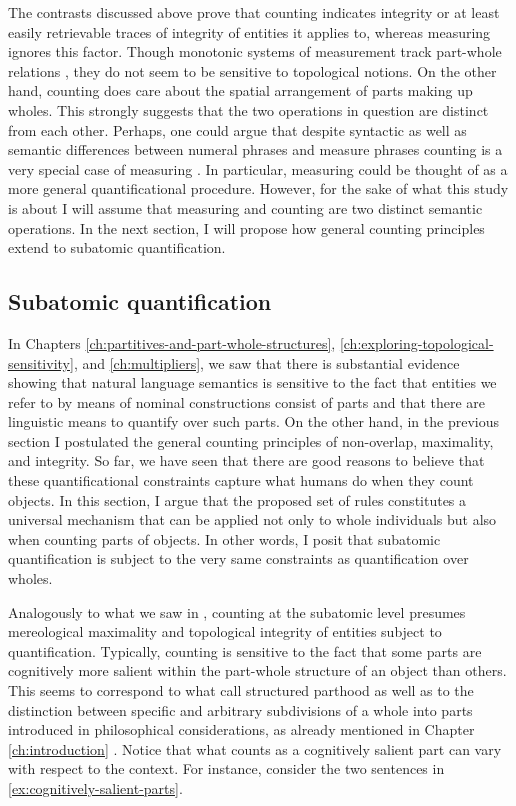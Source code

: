 The contrasts discussed above prove that counting indicates integrity or at least easily retrievable traces of integrity of entities it applies to, whereas measuring ignores this factor. Though monotonic systems of measurement track part-whole relations \citep{schwarzschild2002grammar}, they do not seem to be sensitive to topological notions. On the other hand, counting does care about the spatial arrangement of parts making up wholes. This strongly suggests that the two operations in question are distinct from each other. Perhaps, one could argue that despite syntactic as well as semantic differences between numeral phrases and measure phrases \citep[see][]{rothstein2017semantics} counting is a very special case of measuring \citep[see][]{krifka1989nominal,krifka1995common}. In particular, measuring could be thought of as a more general quantificational procedure.  However, for the sake of what this study is about I will assume that measuring and counting are two distinct semantic operations. In the next section, I will propose how general counting principles extend to subatomic quantification.

\subsection{Subatomic quantification}\label{sec:subatomic-quantification}

In Chapters \ref{ch:partitives-and-part-whole-structures}, \ref{ch:exploring-topological-sensitivity}, and \ref{ch:multipliers}, we saw that there is substantial evidence showing that natural language semantics is sensitive to the fact that entities we refer to by means of nominal constructions consist of parts and that there are linguistic means to quantify over such parts. On the other hand, in the previous section I postulated the general counting principles of non-overlap, maximality, and integrity. So far, we have seen that there are good reasons to believe that these quantificational constraints capture what humans do when they count objects. In this section, I argue that the proposed set of rules constitutes a universal mechanism that can be applied not only to whole individuals but also when counting parts of objects. In other words, I posit that subatomic quantification is subject to the very same constraints as quantification over wholes.

Analogously to what we saw in , counting at the subatomic level presumes mereological maximality and topological integrity of entities subject to quantification. Typically, counting is sensitive to the fact that some parts are cognitively more salient within the part-whole structure of an object than others. This seems to correspond to what \citet{champollion_krifka2016mereology} call structured parthood as well as to the distinction between specific and arbitrary subdivisions of a whole into parts introduced in philosophical considerations, as already mentioned in Chapter \ref{ch:introduction} \citep[e.g.,][]{krecz1986parts,markosian1998brutal,jennings2010against}. Notice that what counts as a cognitively salient part can vary with respect to the context. For instance, consider the two sentences in \ref{ex:cognitively-salient-parts}. 

